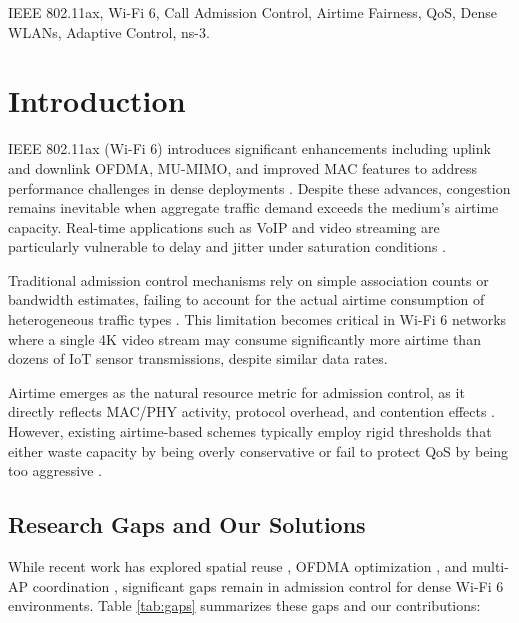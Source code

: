 \documentclass[conference]{IEEEtran}
\begin{document}
\begin{IEEEkeywords}
IEEE 802.11ax, Wi-Fi 6, Call Admission Control, Airtime Fairness, QoS, Dense WLANs, Adaptive Control, ns-3.
\end{IEEEkeywords}

\section{Introduction}

IEEE 802.11ax (Wi-Fi 6) introduces significant enhancements including uplink and downlink OFDMA, MU-MIMO, and improved MAC features to address performance challenges in dense deployments \cite{2, 6}. Despite these advances, congestion remains inevitable when aggregate traffic demand exceeds the medium's airtime capacity. Real-time applications such as VoIP and video streaming are particularly vulnerable to delay and jitter under saturation conditions \cite{13}.

Traditional admission control mechanisms rely on simple association counts or bandwidth estimates, failing to account for the actual airtime consumption of heterogeneous traffic types \cite{3}. This limitation becomes critical in Wi-Fi 6 networks where a single 4K video stream may consume significantly more airtime than dozens of IoT sensor transmissions, despite similar data rates.

Airtime emerges as the natural resource metric for admission control, as it directly reflects MAC/PHY activity, protocol overhead, and contention effects \cite{16}. However, existing airtime-based schemes typically employ rigid thresholds that either waste capacity by being overly conservative or fail to protect QoS by being too aggressive \cite{10}.

\subsection{Research Gaps and Our Solutions}

While recent work has explored spatial reuse \cite{1, 17}, OFDMA optimization \cite{11, 15}, and multi-AP coordination \cite{18}, significant gaps remain in admission control for dense Wi-Fi 6 environments. Table \ref{tab:gaps} summarizes these gaps and our contributions:
\end{document}
